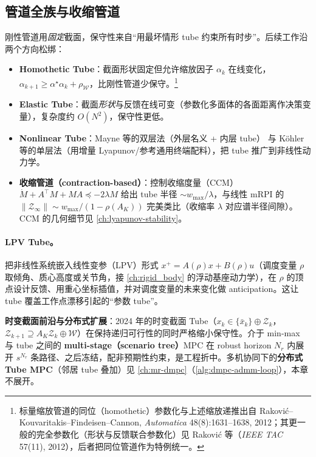 \subsection{管道全族与收缩管道}
\label{sec:mpc-tube-family}
刚性管道用\emph{固定}截面，保守性来自“用最坏情形 tube 约束所有时步”。后续工作沿两个方向松绑：

\begin{itemize}
  \item \textbf{Homothetic Tube}\cite{rakovic2012homothetic}：截面形状固定但允许缩放因子 $\alpha_k$ 在线变化，$\alpha_{k+1}\ge\alpha^\star\alpha_k+\rho_{\mathcal W}$，比刚性管道少保守。\footnote{标量缩放管道的同位（homothetic）参数化与上述缩放递推出自 Rakovi\'c--Kouvaritakis--Findeisen--Cannon, \emph{Automatica} 48(8):1631--1638, 2012；其更一般的完全参数化（形状与反馈联合参数化）见 Rakovi\'c 等\cite{rakovic2012parameterized}（\emph{IEEE TAC} 57(11), 2012），后者把同位管道作为特例统一。}
  \item \textbf{Elastic Tube}\cite{rakovic2016elastic}：截面\emph{形状}与反馈在线可变（参数化多面体的各面距离作决策变量），复杂度约 $O(N^2)$，保守性更低。
  \item \textbf{Nonlinear Tube}：Mayne 等的双层法（外层名义 + 内层 tube）\cite{mayne2011nonlinear} 与 Köhler 等的单层法（用增量 Lyapunov/参考通用终端配料）\cite{koehler2020nonlinear}，把 tube 推广到非线性动力学。
  \item \textbf{收缩管道（contraction-based）}：控制收缩度量（CCM）$\dot M+A^\top M+MA\preceq-2\lambda M$\cite{manchester2017ccm} 给出 tube 半径 $\sim w_{\max}/\lambda$，与线性 mRPI 的 $\|\mathcal Z_\infty\|\sim w_{\max}/(1-\rho(A_K))$ 完美类比（收缩率 $\lambda$ 对应谱半径间隙）。CCM 的几何细节见 \cref{ch:lyapunov-stability}。
\end{itemize}

\paragraph{LPV Tube。}
把非线性系统嵌入线性变参（LPV）形式 $x^+=A(\rho)x+B(\rho)u$（调度变量 $\rho$ 取倾角、质心高度或关节角，接 \cref{ch:rigid_body} 的浮动基座动力学），在 $\rho$ 的顶点设计反馈、用重心坐标插值，并对调度变量的未来变化做 anticipation。这让 tube 覆盖工作点漂移引起的“参数 tube”。

\begin{remark}
\textbf{时变截面前沿与分布式扩展}：2024 年的时变截面 Tube（$x_k\in\{\bar x_k\}\oplus\mathcal Z_k$，$\mathcal Z_{k+1}\supseteq A_K\mathcal Z_k\oplus\mathcal W$）在保持递归可行性的同时严格缩小保守性。介于 min-max 与 tube 之间的 \textbf{multi-stage（scenario tree）}MPC 在 robust horizon $N_r$ 内展开 $s^{N_r}$ 条路径、之后冻结，配非预期性约束，是工程折中。多机协同下的\textbf{分布式 Tube MPC}（邻居 tube 叠加）见 \cref{ch:mr-dmpc}（\cref{alg:dmpc-admm-loop}），本章不展开。
\end{remark}

